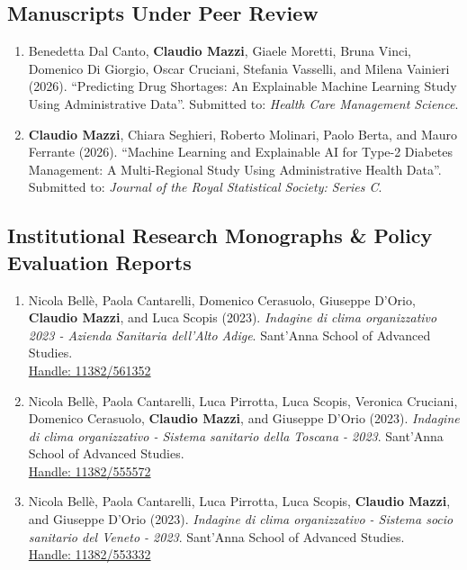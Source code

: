 \documentclass[10pt,a4paper]{article}
\newcommand{\myname}{\textbf{Claudio Mazzi}}
\begin{document}
\subsection{Manuscripts Under Peer Review}
\begin{enumerate}[resume]
    \item Benedetta Dal Canto, \myname, Giaele Moretti, Bruna Vinci, Domenico Di Giorgio, Oscar Cruciani, Stefania Vasselli, and Milena Vainieri (2026). 
    ``Predicting Drug Shortages: An Explainable Machine Learning Study Using Administrative Data''. 
    Submitted to: \textit{Health Care Management Science}.

    \item \myname, Chiara Seghieri, Roberto Molinari, Paolo Berta, and Mauro Ferrante (2026). 
    ``Machine Learning and Explainable AI for Type-2 Diabetes Management: A Multi-Regional Study Using Administrative Health Data''. 
    Submitted to: \textit{Journal of the Royal Statistical Society: Series C}.
\end{enumerate}

\subsection{Institutional Research Monographs \& Policy Evaluation Reports}
\begin{enumerate}[resume]
    \item Nicola Bell\`e, Paola Cantarelli, Domenico Cerasuolo, Giuseppe D’Orio, \myname, and Luca Scopis (2023). 
    \textit{Indagine di clima organizzativo 2023 - Azienda Sanitaria dell’Alto Adige}. 
    Sant’Anna School of Advanced Studies. \\
    \href{https://hdl.handle.net/11382/561352}{\small\color{secondary}\faExternalLink* Handle: 11382/561352}

    \item Nicola Bell\`e, Paola Cantarelli, Luca Pirrotta, Luca Scopis, Veronica Cruciani, Domenico Cerasuolo, \myname, and Giuseppe D’Orio (2023). 
    \textit{Indagine di clima organizzativo - Sistema sanitario della Toscana - 2023}. 
    Sant’Anna School of Advanced Studies. \\
    \href{https://hdl.handle.net/11382/555572}{\small\color{secondary}\faExternalLink* Handle: 11382/555572}

    \item Nicola Bell\`e, Paola Cantarelli, Luca Pirrotta, Luca Scopis, \myname, and Giuseppe D’Orio (2023). 
    \textit{Indagine di clima organizzativo - Sistema socio sanitario del Veneto - 2023}. 
    Sant’Anna School of Advanced Studies. \\
    \href{https://hdl.handle.net/11382/553332}{\small\color{secondary}\faExternalLink* Handle: 11382/553332}
\end{enumerate}
\end{document}
